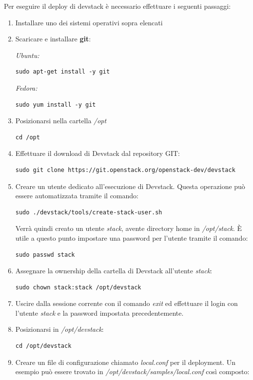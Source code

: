 \documentclass[../main.tex]{subfiles}
\begin{document}
Per eseguire il deploy di devstack è necessario effettuare i seguenti passaggi:
\begin{enumerate}
\item Installare uno dei sistemi operativi sopra elencati
\item Scaricare e installare \textbf{git}:

\textit{Ubuntu:}
\begin{Verbatim}
sudo apt-get install -y git 
\end{Verbatim}
\textit{Fedora:}
\begin{Verbatim}
sudo yum install -y git
\end{Verbatim}
\item Posizionarsi nella cartella \textit{/opt}
\begin{verbatim}
cd /opt
\end{verbatim}
\item Effettuare il download di Devstack dal repository GIT:
\begin{Verbatim}
sudo git clone https://git.openstack.org/openstack-dev/devstack
\end{Verbatim}
\item Creare un utente dedicato all'esecuzione di Devstack. Questa operazione può essere automatizzata tramite il comando:
\begin{Verbatim}
sudo ./devstack/tools/create-stack-user.sh
\end{Verbatim}
Verrà quindi creato un utente \textit{stack}, avente directory home in \textit{/opt/stack}. \`E utile a questo punto impostare una password per l'utente tramite il comando:
\begin{verbatim}
sudo passwd stack
\end{verbatim}
\item Assegnare la ownership della cartella di Devstack all'utente \textit{stack}:
\begin{verbatim}
sudo chown stack:stack /opt/devstack
\end{verbatim}
\item Uscire dalla sessione corrente con il comando \textit{exit} ed effettuare il login con l'utente \textit{stack} e la password impostata precedentemente.
\item Posizionarsi in \textit{/opt/devstack}:
\begin{verbatim}
cd /opt/devstack
\end{verbatim}
\item Creare un file di configurazione chiamato \textit{local.conf} per il deployment. Un esempio può essere trovato in \textit{/opt/devstack/samples/local.conf} così composto:

\end{enumerate}
\end{document}

